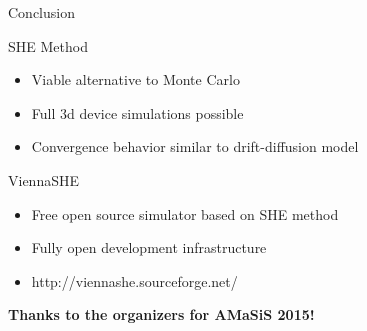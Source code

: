 \documentclass[usepdftitle=false,10pt]{beamer}
\begin{document}
\begin{frame}{Conclusion}

  \begin{block}{SHE Method}
   \begin{itemize}
    \item Viable alternative to Monte Carlo
    \item Full 3d device simulations possible
    \item Convergence behavior similar to drift-diffusion model
   \end{itemize}
  \end{block}
  
  
  \begin{block}{ViennaSHE}
   \begin{itemize}
    \item Free open source simulator based on SHE method
    \item Fully open development infrastructure
    \item http://viennashe.sourceforge.net/
   \end{itemize}
  \end{block}
  
  
  \begin{center}
   \Large \textbf{Thanks to the organizers for AMaSiS 2015!}
  \end{center}

  
\end{frame}
\end{document}
